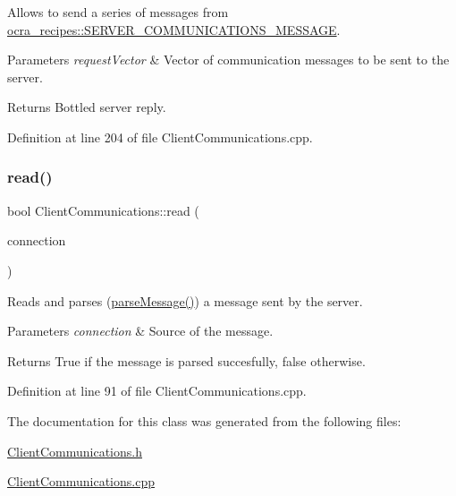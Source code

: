 Allows to send a series of messages from \hyperlink{namespaceocra__recipes_ae6246916f1927f7a201cc153ad76b07d}{ocra\+\_\+recipes\+::\+S\+E\+R\+V\+E\+R\+\_\+\+C\+O\+M\+M\+U\+N\+I\+C\+A\+T\+I\+O\+N\+S\+\_\+\+M\+E\+S\+S\+A\+GE}.


\begin{DoxyParams}{Parameters}
{\em request\+Vector} & Vector of communication messages to be sent to the server.\\
\hline
\end{DoxyParams}
\begin{DoxyReturn}{Returns}
Bottled server reply. 
\end{DoxyReturn}


Definition at line 204 of file Client\+Communications.\+cpp.

\hypertarget{classocra__recipes_1_1ClientCommunications_afbca8bd430e14a0b9a8254a29b78d202}{}\label{classocra__recipes_1_1ClientCommunications_afbca8bd430e14a0b9a8254a29b78d202} 
\subsubsection{\texorpdfstring{read()}{read()}}
{\footnotesize\ttfamily bool Client\+Communications\+::read (\begin{DoxyParamCaption}\item[{yarp\+::os\+::\+Connection\+Reader \&}]{connection }\end{DoxyParamCaption})\hspace{0.3cm}{\ttfamily [virtual]}}

Reads and parses (\hyperlink{classocra__recipes_1_1ClientCommunications_a452774799b5d8448a8ffd3ab5d24aa22}{parse\+Message()}) a message sent by the server.


\begin{DoxyParams}{Parameters}
{\em connection} & Source of the message.\\
\hline
\end{DoxyParams}
\begin{DoxyReturn}{Returns}
True if the message is parsed succesfully, false otherwise. 
\end{DoxyReturn}


Definition at line 91 of file Client\+Communications.\+cpp.



The documentation for this class was generated from the following files\+:\begin{DoxyCompactItemize}
\item 
\hyperlink{ClientCommunications_8h}{Client\+Communications.\+h}\item 
\hyperlink{ClientCommunications_8cpp}{Client\+Communications.\+cpp}\end{DoxyCompactItemize}
